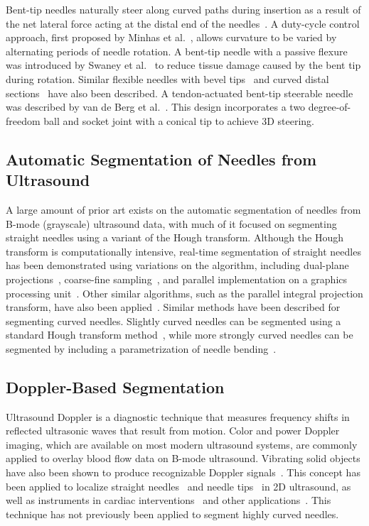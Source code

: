 Bent-tip needles naturally steer along curved paths during insertion as a result of the net lateral force acting at the distal end of the needles~\cite{Webster2006}. A duty-cycle control approach, first proposed by Minhas et al.~\cite{Minhas2007}, allows curvature to be varied by alternating periods of needle rotation. A bent-tip needle with a passive flexure was introduced by Swaney et al.~\cite{Swaney2013} to reduce tissue damage caused by the bent tip during rotation. Similar flexible needles with bevel tips~\cite{OLeary2003,Alterovitz2005} and curved distal sections~\cite{Wedlick2009} have also been described. A tendon-actuated bent-tip steerable needle was described by van de Berg et al.~\cite{vandeBerg2015}. This design incorporates a two degree-of-freedom ball and socket joint with a conical tip to achieve 3D steering.

\subsection{Automatic Segmentation of Needles from Ultrasound}
A large amount of prior art exists on the automatic segmentation of needles from B-mode (grayscale) ultrasound data, with much of it focused on segmenting straight needles using a variant of the Hough transform. Although the Hough transform is computationally intensive, real-time segmentation of straight needles has been demonstrated using variations on the algorithm, including dual-plane projections~\cite{Ding2003b}, coarse-fine sampling~\cite{Ding2003a,Zhou2008}, and parallel implementation on a graphics processing unit~\cite{Novotny2007}. Other similar algorithms, such as the parallel integral projection transform, have also been applied~\cite{Barva2008}. Similar methods have been described for segmenting curved needles. Slightly curved needles can be segmented using a standard Hough transform method~\cite{Okazawa2006,Aboofazeli2009}, while more strongly curved needles can be segmented by including a parametrization of needle bending~\cite{Neshat2008,Okazawa2006,Uhercik2010}.

\subsection{Doppler-Based Segmentation}
\label{sec:Doppler-BasedSegmentation}
Ultrasound Doppler is a diagnostic technique that measures frequency shifts in reflected ultrasonic waves that result from motion. Color and power Doppler imaging, which are available on most modern ultrasound systems, are commonly applied to overlay blood flow data on B-mode ultrasound. Vibrating solid objects have also been shown to produce recognizable Doppler signals~\cite{Holen1985}. This concept has been applied to localize straight needles~\cite{Armstrong2001,Feld1997,Hamper1991} and needle tips~\cite{Harmat2006} in 2D ultrasound, as well as instruments in cardiac interventions~\cite{Fronheiser2008,Reddy2008} and other applications~\cite{McAleavey2003,Rogers2009}. This technique has not previously been applied to segment highly curved needles.

